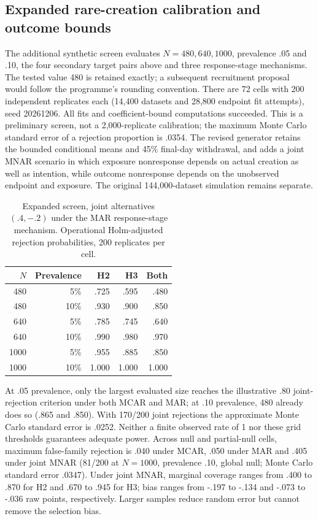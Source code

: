 \documentclass[11pt]{article}
\begin{document}
\subsection{Expanded rare-creation calibration and outcome bounds}
The additional synthetic screen evaluates $N=480,640,1000$, prevalence .05 and .10, the four secondary target pairs above and three response-stage mechanisms. The tested value 480 is retained exactly; a subsequent recruitment proposal would follow the programme's rounding convention. There are 72 cells with 200 independent replicates each (14,400 datasets and 28,800 endpoint fit attempts), seed 20261206. All fits and coefficient-bound computations succeeded. This is a preliminary screen, not a 2,000-replicate calibration; the maximum Monte Carlo standard error of a rejection proportion is .0354. The revised generator retains the bounded conditional means and 45\% final-day withdrawal, and adds a joint MNAR scenario in which exposure nonresponse depends on actual creation as well as intention, while outcome nonresponse depends on the unobserved endpoint and exposure. The original 144,000-dataset simulation remains separate.

\begin{table}[htbp]
\centering\small
\caption{Expanded screen, joint alternatives $(.4,-.2)$ under the MAR response-stage mechanism. Operational Holm-adjusted rejection probabilities, 200 replicates per cell.}
\label{tab:secondary-expanded}
\begin{tabular}{@{}rrrrr@{}}
\toprule
$N$ & Prevalence & H2 & H3 & Both\\
\midrule
480 & 5\% & .725 & .595 & .480\\
480 & 10\% & .930 & .900 & .850\\
640 & 5\% & .785 & .745 & .640\\
640 & 10\% & .990 & .980 & .970\\
1000 & 5\% & .955 & .885 & .850\\
1000 & 10\% & 1.000 & 1.000 & 1.000\\
\bottomrule
\end{tabular}
\end{table}

At .05 prevalence, only the largest evaluated size reaches the illustrative .80 joint-rejection criterion under both MCAR and MAR; at .10 prevalence, 480 already does so (.865 and .850). With 170/200 joint rejections the approximate Monte Carlo standard error is .0252. Neither a finite observed rate of 1 nor these grid thresholds guarantees adequate power. Across null and partial-null cells, maximum false-family rejection is .040 under MCAR, .050 under MAR and .405 under joint MNAR (81/200 at $N=1000$, prevalence .10, global null; Monte Carlo standard error .0347). Under joint MNAR, marginal coverage ranges from .400 to .870 for H2 and .670 to .945 for H3; bias ranges from -.197 to -.134 and -.073 to -.036 raw points, respectively. Larger samples reduce random error but cannot remove the selection bias.
\end{document}
